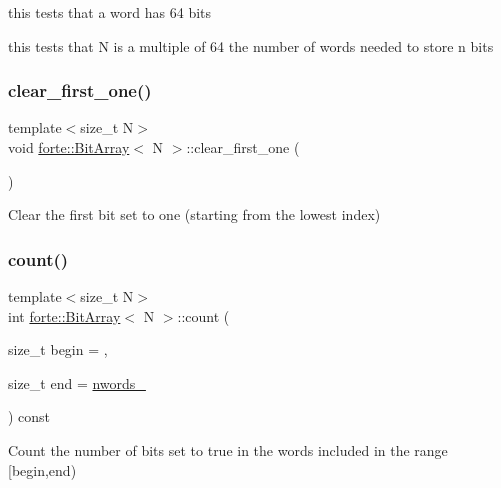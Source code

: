 this tests that a word has 64 bits 

this tests that N is a multiple of 64 the number of words needed to store n bits \mbox{\label{classforte_1_1_bit_array_ae8b38769188be526a5c7be0aeb2481df}} 
\subsubsection{\texorpdfstring{clear\+\_\+first\+\_\+one()}{clear\_first\_one()}}
{\footnotesize\ttfamily template$<$size\+\_\+t N$>$ \\
void \mbox{\hyperlink{classforte_1_1_bit_array}{forte\+::\+Bit\+Array}}$<$ N $>$\+::clear\+\_\+first\+\_\+one (\begin{DoxyParamCaption}{ }\end{DoxyParamCaption})\hspace{0.3cm}{\ttfamily [inline]}}



Clear the first bit set to one (starting from the lowest index) 

\mbox{\label{classforte_1_1_bit_array_a96c011285fabafbfcdeed8ab23caafef}} 
\subsubsection{\texorpdfstring{count()}{count()}}
{\footnotesize\ttfamily template$<$size\+\_\+t N$>$ \\
int \mbox{\hyperlink{classforte_1_1_bit_array}{forte\+::\+Bit\+Array}}$<$ N $>$\+::count (\begin{DoxyParamCaption}\item[{size\+\_\+t}]{begin = {},  }\item[{size\+\_\+t}]{end = {\ttfamily \mbox{\hyperlink{classforte_1_1_bit_array_aeaa8016f00f9ffc5822081f7e45656e8}{nwords\+\_\+}}} }\end{DoxyParamCaption}) const\hspace{0.3cm}{\ttfamily [inline]}}



Count the number of bits set to true in the words included in the range \mbox{[}begin,end) 

